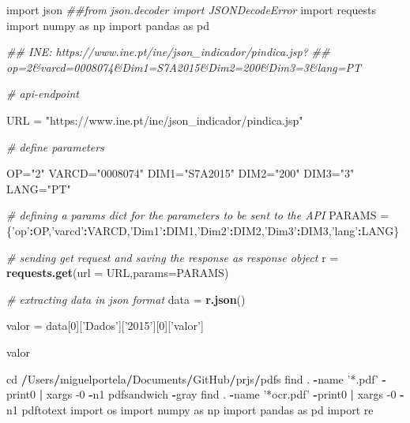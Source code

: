 \documentclass[
  12pt,
]{article}
\newenvironment{Shaded}{\begin{snugshade}}{\end{snugshade}}
\newcommand{\CommentTok}[1]{\textcolor[rgb]{0.56,0.35,0.01}{\textit{#1}}}
\newcommand{\DataTypeTok}[1]{\textcolor[rgb]{0.13,0.29,0.53}{#1}}
\newcommand{\DecValTok}[1]{\textcolor[rgb]{0.00,0.00,0.81}{#1}}
\newcommand{\KeywordTok}[1]{\textcolor[rgb]{0.13,0.29,0.53}{\textbf{#1}}}
\newcommand{\NormalTok}[1]{#1}
\newcommand{\OperatorTok}[1]{\textcolor[rgb]{0.81,0.36,0.00}{\textbf{#1}}}
\newcommand{\StringTok}[1]{\textcolor[rgb]{0.31,0.60,0.02}{#1}}
\begin{document}
\begin{Shaded}
\begin{Highlighting}[]
\NormalTok{import json}
\CommentTok{##from json.decoder import JSONDecodeError}
\NormalTok{import requests}
\NormalTok{import numpy as np}
\NormalTok{import pandas as pd}

\CommentTok{## INE: https://www.ine.pt/ine/json_indicador/pindica.jsp?}
\CommentTok{## op=2&varcd=0008074&Dim1=S7A2015&Dim2=200&Dim3=3&lang=PT}

\CommentTok{# api-endpoint}

\NormalTok{URL =}\StringTok{ "https://www.ine.pt/ine/json_indicador/pindica.jsp"}

\CommentTok{# define parameters}

\NormalTok{OP=}\StringTok{"2"}
\NormalTok{VARCD=}\StringTok{"0008074"}
\NormalTok{DIM1=}\StringTok{"S7A2015"}
\NormalTok{DIM2=}\StringTok{"200"}
\NormalTok{DIM3=}\StringTok{"3"}
\NormalTok{LANG=}\StringTok{"PT"}


\CommentTok{# defining a params dict for the parameters to be sent to the API}
\NormalTok{PARAMS =}\StringTok{ }\NormalTok{\{}\StringTok{'op'}\OperatorTok{:}\NormalTok{OP,}\StringTok{'varcd'}\OperatorTok{:}\NormalTok{VARCD,}\StringTok{'Dim1'}\OperatorTok{:}\NormalTok{DIM1,}\StringTok{'Dim2'}\OperatorTok{:}\NormalTok{DIM2,}\StringTok{'Dim3'}\OperatorTok{:}\NormalTok{DIM3,}\StringTok{'lang'}\OperatorTok{:}\NormalTok{LANG\}}

\CommentTok{# sending get request and saving the response as response object}
\NormalTok{r =}\StringTok{ }\KeywordTok{requests.get}\NormalTok{(}\DataTypeTok{url =}\NormalTok{ URL,}\DataTypeTok{params=}\NormalTok{PARAMS)}

\CommentTok{# extracting data in json format}
\NormalTok{data =}\StringTok{ }\KeywordTok{r.json}\NormalTok{()}

\NormalTok{valor =}\StringTok{ }\NormalTok{data[}\DecValTok{0}\NormalTok{][}\StringTok{'Dados'}\NormalTok{][}\StringTok{'2015'}\NormalTok{][}\DecValTok{0}\NormalTok{][}\StringTok{'valor'}\NormalTok{]}

\NormalTok{valor}

\NormalTok{  cd }\OperatorTok{/}\NormalTok{Users}\OperatorTok{/}\NormalTok{miguelportela}\OperatorTok{/}\NormalTok{Documents}\OperatorTok{/}\NormalTok{GitHub}\OperatorTok{/}\NormalTok{prjs}\OperatorTok{/}\NormalTok{pdfs}
\NormalTok{    find . }\OperatorTok{-}\NormalTok{name }\StringTok{'*.pdf'} \OperatorTok{-}\NormalTok{print0 }\OperatorTok{|}\StringTok{ }\NormalTok{xargs }\DecValTok{-0} \OperatorTok{-}\NormalTok{n1 pdfsandwich }\OperatorTok{-}\NormalTok{gray}
\NormalTok{    find . }\OperatorTok{-}\NormalTok{name }\StringTok{'*ocr.pdf'} \OperatorTok{-}\NormalTok{print0 }\OperatorTok{|}\StringTok{ }\NormalTok{xargs }\DecValTok{-0} \OperatorTok{-}\NormalTok{n1 pdftotext}
\NormalTok{import os}
\NormalTok{import numpy as np}
\NormalTok{import pandas as pd}
\NormalTok{import re}


\end{Highlighting}
\end{Shaded}
\end{document}
